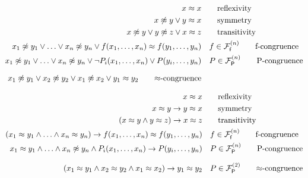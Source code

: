 \begin{example}
\begin{align*}
	 x \mEQ x & \tag*{reflexivity} \\
	x \mNE y \lor y \mEQ x & \tag*{symmetry}\\
	x\mNE y\lor y\mNE z\lor x\mEQ z & \tag*{transitivity} \\
	x_1 \mNE y_1\lor\ldots\lor x_n \mNE y_n\lor f(x_1,\ldots,x_n)\mEQ f(y_1,\ldots,y_n) &\quad f\in\mcFfn
	\tag*{f-congruence}
	\\
	x_1\mNE y_1\lor\ldots\lor x_n\mNE y_n\lor\lnot P_i(x_1,\ldots,x_n)\lor P(y_i,\ldots,y_n) &\quad P\in\mcFPn
	\tag*{P-congruence}
	\\[0.7em]
	x_1\mNE y_1\lor x_2\mNE y_2
	\lor x_1\mNE x_2
	\lor y_1\mEQ y_2
	\tag*{$\mEQ$-congruence}
\end{align*}

\begin{align*}
	x \mEQ x & \tag*{reflexivity} 
	\\
	x \mEQ y \limp y \mEQ x & \tag*{symmetry}
	\\
	(x\mEQ y\land y\mEQ z)\limp x\mEQ z & \tag*{transitivity} 
	\\
	(x_1 \mEQ y_1\land\ldots\land x_n \mEQ y_n)\limp f(x_1,\ldots,x_n)\mEQ f(y_1,\ldots,y_n) &\quad f\in\mcFfn
	\tag*{f-congruence}
	\\
	x_1\mEQ y_1\land\ldots\land x_n\mNE y_n\land P_i(x_1,\ldots,x_n)
	\limp P(y_i,\ldots,y_n) &\quad P\in\mcFPn
	\tag*{P-congruence}
	\\[0.7em]
	(x_1\mEQ y_1
	\land x_2\mEQ y_2
	\land x_1\mEQ x_2)
	\limp y_1\mEQ y_2
	& \quad P\in\mcFPn[2]
		\tag*{$\mEQ$-congruence}
\end{align*}
	
	







\end{example}

